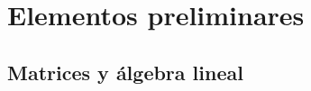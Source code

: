 
\chapter{Elementos preliminares}


\newpage

\newpage

\newpage

\newpage





\newpage
\section{Matrices y álgebra lineal}

